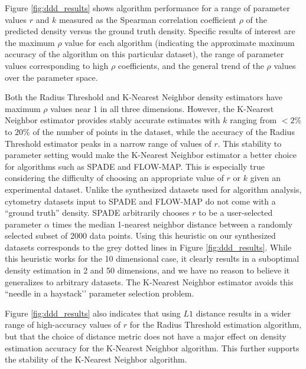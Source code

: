 \documentclass{article}
\begin{document}
Figure \ref{fig:ddd_results} shows algorithm performance for a range of parameter values $r$ and $k$ measured as the Spearman correlation coefficient $\rho$ of the predicted density versus the ground truth density.  
 Specific results of interest are the maximum $\rho$ value for each algorithm (indicating the approximate maximum accuracy of the algorithm on this particular dataset), the range of parameter values corresponding to high $\rho$ coefficients, and the general trend of the $\rho$ values over the parameter space. 

Both the  Radius Threshold and K-Nearest Neighbor density estimators have maximum $\rho$ values near 1 in all three dimensions. 
However, the K-Nearest Neighbor estimator provides stably accurate estimates with $k$ ranging from $<2\%$ to $20\%$ of the number of points in the dataset, while the accuracy of the Radius Threshold estimator peaks in a narrow range of values of $r$. 
This stability to parameter setting would make the K-Nearest Neighbor estimator a better choice for algorithms such as SPADE and FLOW-MAP.  
This is especially true considering the difficulty of choosing an appropriate value of $r$ or $k$ given an experimental dataset. 
 Unlike the synthesized datasets used for algorithm analysis, cytometry datasets input to SPADE and FLOW-MAP do not come with a ``ground truth'' density.  
SPADE arbitrarily chooses $r$ to be a user-selected parameter $\alpha$ times the median 1-nearest neighbor distance between a randomly selected subset of 2000 data points. 
Using this heuristic on our synthesized datasets corresponds to the grey dotted lines in Figure \ref{fig:ddd_results}.  
While this heuristic works for the 10 dimensional case, it clearly results in a suboptimal density estimation in 2 and 50 dimensions, and we have no reason to believe it generalizes to arbitrary datasets. 
The K-Nearest Neighbor estimator avoids this ``needle in a haystack’’ parameter selection problem.

Figure \ref{fig:ddd_results} also indicates that using $L1$ distance results in a wider range of high-accuracy values of $r$ for the Radius Threshold estimation algorithm, but that the choice of distance metric does not have a major effect on density estimation accuracy for the K-Nearest Neighbor algorithm. 
 This further supports the stability of the K-Nearest Neighbor algorithm.  
\end{document}

